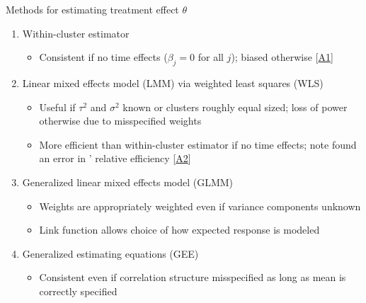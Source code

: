 \documentclass[9pt]{beamer}
\begin{document}
\begin{frame}{Methods for estimating treatment effect $\theta$ \citep{Hussey:2007}} \label{slide:methods}

\begin{enumerate}
\setlength\itemsep{2em}

\item
Within-cluster estimator
\begin{itemize}
\setlength\itemsep{0.5em}
\item
Consistent if no time effects ($\beta_j=0$ for all $j$); biased otherwise [\hyperlink{apx:withincluster}{A1}]
\end{itemize}

\item
Linear mixed effects model (LMM) via weighted least squares (WLS)
\begin{itemize}
\setlength\itemsep{0.5em}
\item
Useful if $\tau^2$ and $\sigma^2$ known or clusters roughly equal sized; loss of power otherwise due to misspecified weights
\item
More efficient than within-cluster estimator if no time effects; note \citet{Liao:2015} found an error in \citeauthor{Hussey:2007}' relative efficiency [\hyperlink{apx:efficiency}{A2}]
\end{itemize}

\item
Generalized linear mixed effects model (GLMM)
\begin{itemize}
\setlength\itemsep{0.5em}
\item
Weights are appropriately weighted even if variance components unknown
\item
Link function allows choice of how expected response is modeled
\end{itemize}

\item
Generalized estimating equations (GEE)
\begin{itemize}
\setlength\itemsep{0.5em}
\item
Consistent even if correlation structure misspecified as long as mean is correctly specified
\end{itemize}

\end{enumerate}
\end{frame}
\end{document}

